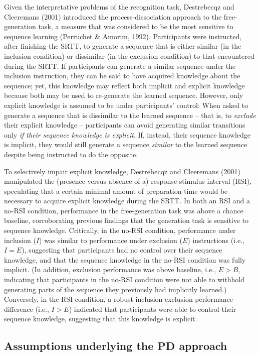 \documentclass[floatsintext,doc]{apa6}
\theoremstyle{definition}
\theoremstyle{definition}
\theoremstyle{definition}
\theoremstyle{remark}
\begin{document}
Given the interpretative problems of the recognition task, Destrebecqz
and Cleeremans (2001) introduced the process-dissociation approach to
the free-generation task, a measure that was considered to be the most
sensitive to sequence learning (Perruchet \& Amorim, 1992). Participants
were instructed, after finishing the SRTT, to generate a sequence that
is either similar (in the inclusion condition) or dissimilar (in the
exclusion condition) to that encountered during the SRTT. If
participants can generate a similar sequence under the inclusion
instruction, they can be said to have acquired knowledge about the
sequence; yet, this knowledge may reflect both implicit and explicit
knowledge because both may be used to re-generate the learned sequence.
However, only explicit knowledge is assumed to be under participants'
control: When asked to generate a sequence that is dissimilar to the
learned sequence -- that is, to \emph{exclude} their explicit knowledge
-- participants can avoid generating similar transitions only \emph{if
their sequence knowledge is explicit}. If, instead, their sequence
knowledge is implicit, they would still generate a sequence
\emph{similar} to the learned sequence despite being instructed to do
the opposite.

To selectively impair explicit knowledge, Destrebecqz and Cleeremans
(2001) manipulated the (presence versus absence of a) response-stimulus
interval (RSI), speculating that a certain minimal amount of preparation
time would be necessary to acquire explicit knowledge during the SRTT.
In both an RSI and a no-RSI condition, performance in the
free-generation task was above a chance baseline, corroborating previous
findings that the generation task is sensitive to sequence knowledge.
Critically, in the no-RSI condition, performance under inclusion (\(I\))
was similar to performance under exclusion (\(E\)) instructions (i.e.,
\(I=E\)), suggesting that participants had no control over their
sequence knowledge, and that the sequence knowledge in the no-RSI
condition was fully implicit. (In addition, exclusion performance was
above baseline, i.e., \(E > B\), indicating that participants in the
no-RSI condition were not able to withhold generating parts of the
sequence they previously had implicitly learned.) Conversely, in the RSI
condition, a robust inclusion-exclusion performance difference (i.e.,
\(I > E\)) indicated that participants were able to control their
sequence knowledge, suggesting that this knowledge is explicit.

\subsection{Assumptions underlying the PD
approach}\label{assumptions-underlying-the-pd-approach}
\end{document}
